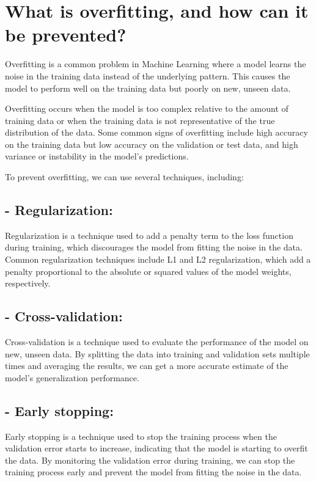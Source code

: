 \section{What is overfitting, and how can it be prevented?}
Overfitting is a common problem in Machine Learning where a model learns the noise in the training data instead of the underlying pattern. This causes the model to perform well on the training data but poorly on new, unseen data.

Overfitting occurs when the model is too complex relative to the amount of training data or when the training data is not representative of the true distribution of the data. Some common signs of overfitting include high accuracy on the training data but low accuracy on the validation or test data, and high variance or instability in the model's predictions.

To prevent overfitting, we can use several techniques, including:

\subsection{- Regularization:}  Regularization is a technique used to add a penalty term to the loss function during training, which discourages the model from fitting the noise in the data. Common regularization techniques include L1 and L2 regularization, which add a penalty proportional to the absolute or squared values of the model weights, respectively.

\subsection{- Cross-validation:}  Cross-validation is a technique used to evaluate the performance of the model on new, unseen data. By splitting the data into training and validation sets multiple times and averaging the results, we can get a more accurate estimate of the model's generalization performance.

\subsection{- Early stopping:}  Early stopping is a technique used to stop the training process when the validation error starts to increase, indicating that the model is starting to overfit the data. By monitoring the validation error during training, we can stop the training process early and prevent the model from fitting the noise in the data.

